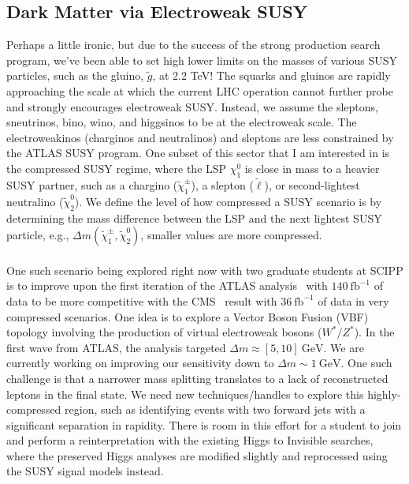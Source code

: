\documentclass[10pt,a4paper,sans]{moderncv} %
\begin{document}
\subsection{Dark Matter via Electroweak SUSY}
Perhaps a little ironic, but due to the success of the strong production search program, we've been able to set high lower limits on the masses of various SUSY particles, such as the gluino, $\tilde{g}$, at 2.2 TeV! The squarks and gluinos are rapidly approaching the scale at which the current LHC operation cannot further probe and strongly encourages electroweak SUSY. Instead, we assume the sleptons, sneutrinos, bino, wino, and higgsinos to be at the electroweak scale. The electroweakinos (charginos and neutralinos) and sleptons are less constrained by the ATLAS SUSY program.  One subset of this sector that I am interested in is the compressed SUSY regime, where the LSP $\chi_1^0$ is close in mass to a heavier SUSY partner, such as a chargino ($\tilde{\chi}_1^\pm$), a slepton ($\tilde{\ell}$), or second-lightest neutralino ($\tilde{\chi}_2^0$). We define the level of how compressed a SUSY scenario is by determining the mass difference between the LSP and the next lightest SUSY particle, e.g., $\Delta m(\tilde{\chi}_1^\pm, \tilde{\chi}_2^0)$, smaller values are more compressed.
\\
\\
One such scenario being explored right now with two graduate students at SCIPP is to improve upon the first iteration of the ATLAS analysis~\cite{ATLAS:2019lng} with $140\ \mathrm{fb}^{-1}$ of data to be more competitive with the CMS~\cite{CMS:2019san} result with $36\ \mathrm{fb}^{-1}$ of data in very compressed scenarios. One idea is to explore a Vector Boson Fusion (VBF) topology involving the production of virtual electroweak bosons ($W^*/ Z^*$). In the first wave from ATLAS, the analysis targeted $\Delta m \approx [5, 10]\ \mathrm{GeV}$. We are currently working on improving our sensitivity down to $\Delta m \sim 1\ \mathrm{GeV}$. One such challenge is that a narrower mass splitting translates to a lack of reconstructed leptons in the final state. We need new techniques/handles to explore this highly-compressed region, such as identifying events with two forward jets with a significant separation in rapidity. There is room in this effort for a student to join and perform a reinterpretation with the existing Higgs to Invisible searches, where the preserved Higgs analyses are modified slightly and reprocessed using the SUSY signal models instead.
\end{document}
